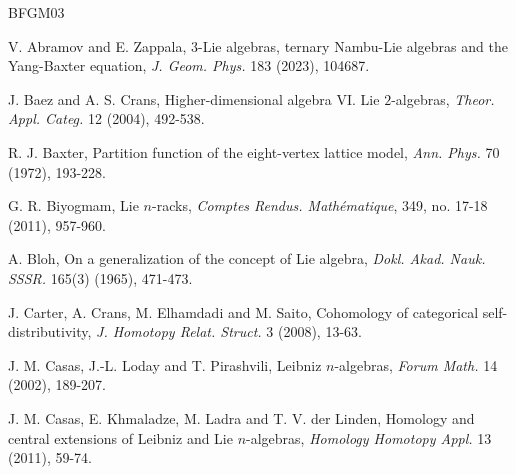 \documentclass[a4paper,reqno,10pt]{amsart}
\theoremstyle{plain}
\theoremstyle{definition}
\theoremstyle{remark}
\begin{document}
\begin{thebibliography}{BFGM03}

 V. Abramov and E. Zappala, $3$-Lie algebras, ternary Nambu-Lie algebras and the Yang-Baxter equation, {\em J. Geom. Phys.} 183 (2023), 104687.


 J. Baez and A. S. Crans, Higher-dimensional algebra VI. Lie $2$-algebras, {\em Theor. Appl. Categ.} 12 (2004), 492-538. 


 R. J. Baxter, Partition function of the eight-vertex lattice model, {\em Ann. Phys.} 70 (1972), 193-228.

 G. R. Biyogmam, Lie $n$-racks, {\em Comptes Rendus. Math\'{e}matique}, 349, no. 17-18 (2011), 957-960.

 A. Bloh, On a generalization of the concept of Lie algebra, {\em Dokl. Akad. Nauk. SSSR.} 165(3) (1965), 471-473.


 J. Carter, A. Crans, M. Elhamdadi and M. Saito, Cohomology of categorical self-distributivity, {\em J. Homotopy Relat. Struct.} 3 (2008), 13-63.

 J. M. Casas, J.-L. Loday and T. Pirashvili, Leibniz $n$-algebras, {\em Forum Math.} 14 (2002), 189-207.


 J. M. Casas, E. Khmaladze, M. Ladra and T. V. der Linden, Homology and central extensions of Leibniz and Lie $n$-algebras, {\em Homology Homotopy Appl.} 13 (2011), 59-74.






\end{thebibliography}
\end{document}
